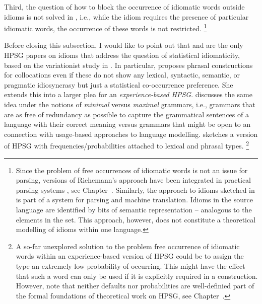 \documentclass[output=paper]{langsci/langscibook}
\begin{document}
Third, the question of how to block the occurrence of idiomatic words outside idioms is not solved in \cite{Riehemann2001a}, i.e., while the idiom requires the presence of particular idiomatic words, the occurrence of these words is not restricted.%
\footnote{Since the problem of free occurrences of idiomatic words is not an issue for parsing, versions of Riehemann's approach have been integrated in practical parsing systems \citep{Villavicencio:Copestake:02}, see Chapter~. 
Similarly, the approach to idioms sketched in \cite{Flickinger:15Slides2} 
is part of a system for parsing and machine translation. Idioms in the source language are identified by bits of semantic representation -- analogous to the elements in the  set. This approach, however, does not constitute a theoretical modelling of idioms within one language.}


\bigskip%
Before closing this subsection, I would like to point out that 
\cite{Riehemann2001a} and \cite{RB99a} are the only HPSG papers on idioms that address the question of statistical idiomaticity, based on the variationist study in \cite{Bender2000a}. 
In particular, \citet[--301]{Riehemann2001a} proposes phrasal constructions for collocations even if these do not show any lexical, syntactic, semantic, or pragmatic idiosyncrasy but just a statistical co-occurrence preference. 
She extends this into a larger plea for an \emph{experience-based HPSG}. 
%
\cite{Bender2000a} discusses the same idea under the notions of \emph{minimal} versus \emph{maximal} grammars, i.e., grammars that are as free of redundancy as possible to capture the grammatical sentences of a language with their correct meaning versus grammars that might be open to an connection with usage-based approaches to language modelling.
\citet[]{Bender2000a} sketches a version of HPSG with frequencies/probabilities attached to lexical and phrasal types.%
\footnote{A so-far unexplored solution to the problem free occurrence of idiomatic words within an experience-based version of HPSG could be to assign the type  an extremely low probability of occurring. This might have the effect that such a word can only be used if it is explicitly required in a construction. However, note that neither defaults nor probabilities are well-definied part of the formal foundations of theoretical work on HPSG, see Chapter~.}
\end{document}
